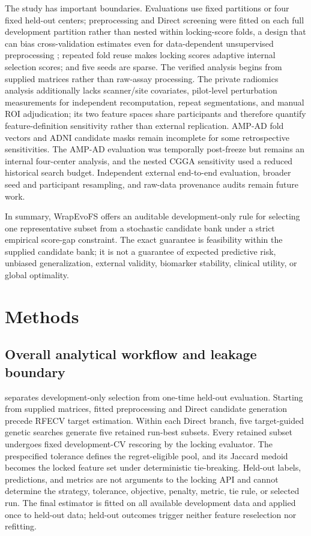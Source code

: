 The study has important boundaries. Evaluations use fixed partitions or four fixed held-out centers; preprocessing and Direct screening were fitted on each full development partition rather than nested within locking-score folds, a design that can bias cross-validation estimates even for data-dependent unsupervised preprocessing \citep{ref39}; repeated fold reuse makes locking scores adaptive internal selection scores; and five seeds are sparse. The verified analysis begins from supplied matrices rather than raw-assay processing. The private radiomics analysis additionally lacks scanner/site covariates, pilot-level perturbation measurements for independent recomputation, repeat segmentations, and manual ROI adjudication; its two feature spaces share participants and therefore quantify feature-definition sensitivity rather than external replication. AMP-AD fold vectors and ADNI candidate masks remain incomplete for some retrospective sensitivities. The AMP-AD evaluation was temporally post-freeze but remains an internal four-center analysis, and the nested CGGA sensitivity used a reduced historical search budget. Independent external end-to-end evaluation, broader seed and participant resampling, and raw-data provenance audits remain future work.

In summary, WrapEvoFS offers an auditable development-only rule for selecting one representative subset from a stochastic candidate bank under a strict empirical score-gap constraint. The exact guarantee is feasibility within the supplied candidate bank; it is not a guarantee of expected predictive risk, unbiased generalization, external validity, biomarker stability, clinical utility, or global optimality.

\FloatBarrier
\section{Methods}

\subsection{Overall analytical workflow and leakage boundary}

 separates development-only selection from one-time held-out evaluation. Starting from supplied matrices, fitted preprocessing and Direct candidate generation precede RFECV target estimation. Within each Direct branch, five target-guided genetic searches generate five retained run-best subsets. Every retained subset undergoes fixed development-CV rescoring by the locking evaluator. The prespecified tolerance defines the regret-eligible pool, and its Jaccard medoid becomes the locked feature set under deterministic tie-breaking. Held-out labels, predictions, and metrics are not arguments to the locking API and cannot determine the strategy, tolerance, objective, penalty, metric, tie rule, or selected run. The final estimator is fitted on all available development data and applied once to held-out data; held-out outcomes trigger neither feature reselection nor refitting.

